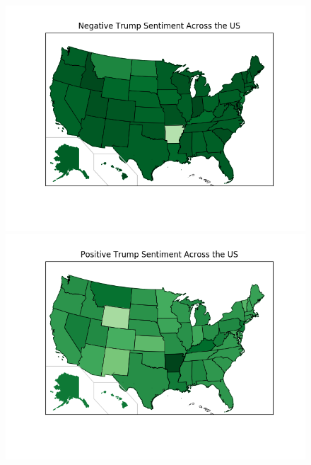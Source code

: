 \documentclass[12pt]{article}
\begin{document}
\begin{figure}[H]
        \begin{center}
                          \includegraphics[width=\linewidth,trim={2cm 2cm 1.65cm 0},clip]{plot2_negative_by_state.png}
                \endminipage\hfill
                          \includegraphics[width=\linewidth,trim={2cm 2cm 1.65cm 0},clip]{plot2_positive_by_state.png}
                \endminipage\hfill

\end{center}
\end{figure}
\end{document}
